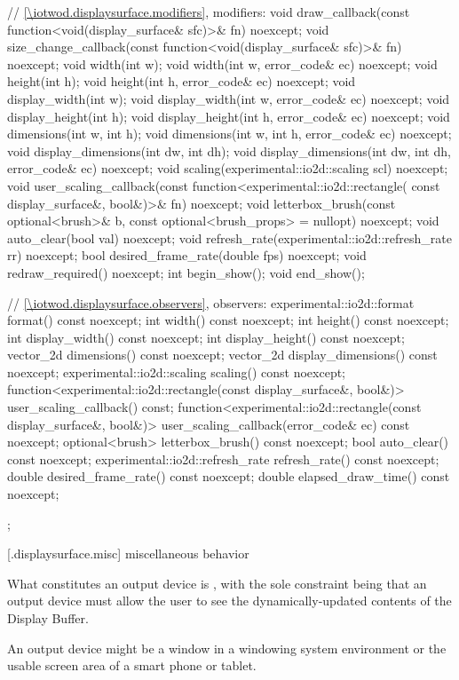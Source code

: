 \begin{codeblock}
{{{{{    // \ref{\iotwod.displaysurface.modifiers}, modifiers:
    void draw_callback(const function<void(display_surface& sfc)>& fn) noexcept;
    void size_change_callback(const function<void(display_surface& sfc)>& fn)
      noexcept;
    void width(int w);
    void width(int w, error_code& ec) noexcept;
    void height(int h);
    void height(int h, error_code& ec) noexcept;
    void display_width(int w);
    void display_width(int w, error_code& ec) noexcept;
    void display_height(int h);
    void display_height(int h, error_code& ec) noexcept;
    void dimensions(int w, int h);
    void dimensions(int w, int h, error_code& ec) noexcept;
    void display_dimensions(int dw, int dh);
    void display_dimensions(int dw, int dh, error_code& ec) noexcept;
    void scaling(experimental::io2d::scaling scl) noexcept;
    void user_scaling_callback(const function<experimental::io2d::rectangle(
      const display_surface&, bool&)>& fn) noexcept;
    void letterbox_brush(const optional<brush>& b,
      const optional<brush_props> = nullopt) noexcept;
    void auto_clear(bool val) noexcept;
    void refresh_rate(experimental::io2d::refresh_rate rr) noexcept;
    bool desired_frame_rate(double fps) noexcept;
    void redraw_required() noexcept;
    int begin_show();
    void end_show();
    
    // \ref{\iotwod.displaysurface.observers}, observers:
    experimental::io2d::format format() const noexcept;
    int width() const noexcept;
    int height() const noexcept;
    int display_width() const noexcept;
    int display_height() const noexcept;
    vector_2d dimensions() const noexcept;
    vector_2d display_dimensions() const noexcept;
    experimental::io2d::scaling scaling() const noexcept;
    function<experimental::io2d::rectangle(const display_surface&,
      bool&)> user_scaling_callback() const;
    function<experimental::io2d::rectangle(const display_surface&,
      bool&)> user_scaling_callback(error_code& ec) const noexcept;
    optional<brush> letterbox_brush() const noexcept;
    bool auto_clear() const noexcept;
    experimental::io2d::refresh_rate refresh_rate() const noexcept;
    double desired_frame_rate() const noexcept;
    double elapsed_draw_time() const noexcept;
  };
} } } }
\end{codeblock}

 [\iotwod.displaysurface.misc] { miscellaneous behavior}%

\pnum
What constitutes an output device is , with the sole constraint being that an output device must allow the user to see the dynamically-updated contents of the Display Buffer.
\begin{example}
An output device might be a window in a windowing system environment or the usable screen area of a smart phone or tablet.
\end{example}

